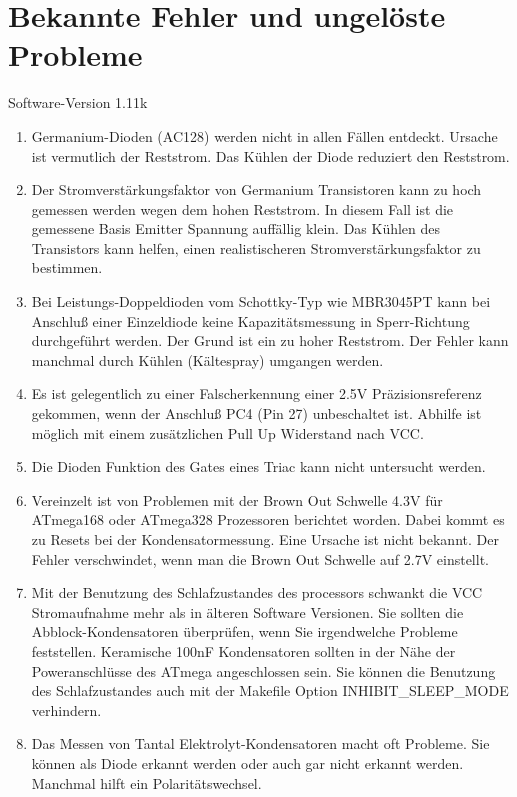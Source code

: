 
\chapter{Bekannte Fehler und ungelöste Probleme}
{\center Software-Version 1.11k}

\begin{enumerate}

\item Germanium-Dioden (AC128) werden nicht in allen Fällen entdeckt. Ursache ist vermutlich der Reststrom.
Das Kühlen der Diode reduziert den Reststrom.

\item Der Stromverstärkungsfaktor von Germanium Transistoren kann zu hoch gemessen werden wegen dem hohen Reststrom.
In diesem Fall ist die gemessene Basis Emitter Spannung auffällig klein.
Das Kühlen des Transistors kann helfen, einen realistischeren Stromverstärkungsfaktor zu bestimmen.

\item Bei Leistungs-Doppeldioden vom Schottky-Typ wie MBR3045PT kann bei Anschluß einer Einzeldiode keine Kapazitätsmessung in Sperr-Richtung 
durchgeführt werden. Der Grund ist ein zu hoher Reststrom. Der Fehler kann manchmal durch Kühlen (Kältespray) umgangen werden.

\item Es ist gelegentlich zu einer Falscherkennung einer 2.5V Präzisionsreferenz gekommen, wenn der Anschluß PC4 (Pin 27) unbeschaltet ist.
Abhilfe ist möglich mit einem zusätzlichen Pull Up Widerstand nach VCC.

\item Die Dioden Funktion des Gates eines Triac kann nicht untersucht werden.

\item Vereinzelt ist von Problemen mit der Brown Out Schwelle 4.3V für ATmega168 oder ATmega328 Prozessoren berichtet worden.
Dabei kommt es zu Resets bei der Kondensatormessung.  Eine Ursache ist nicht bekannt.
Der Fehler verschwindet, wenn man die Brown Out Schwelle auf 2.7V einstellt.

\item Mit der Benutzung des Schlafzustandes des processors schwankt die VCC Stromaufnahme mehr als
in älteren Software Versionen.
Sie sollten die Abblock-Kondensatoren überprüfen, wenn Sie irgendwelche Probleme feststellen.
Keramische 100nF Kondensatoren sollten in der Nähe der Poweranschlüsse des ATmega angeschlossen sein.
Sie können die Benutzung des Schlafzustandes auch mit der Makefile Option INHIBIT\_SLEEP\_MODE verhindern.

\item Das Messen von Tantal Elektrolyt-Kondensatoren macht oft Probleme.
Sie können als Diode erkannt werden oder auch gar nicht erkannt werden.
Manchmal hilft ein Polaritätswechsel.

\end{enumerate}
